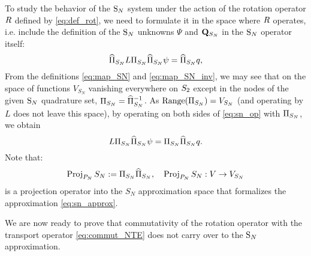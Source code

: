 To study the behavior of the $\text{S}_{N}$ system under the action of the rotation operator $R$
defined by \eqref{eq:def_rot}, we need to formulate it in the space where $R$ operates, i.e. include the definition
of the $\text{S}_{N}$ unknowns $\Psi$ and $\mathbf{Q}_{S_N}$ in the $\text{S}_{N}$ operator itself:
\begin{equation}\label{eq:sn_op}
	\widehat\Pi_{S_N} L\Pi_{S_N} \widehat\Pi_{S_N} \psi = \widehat\Pi_{S_N} q,
\end{equation}
From the definitions \eqref{eq:map_SN} and \eqref{eq:map_SN_inv}, we may see that on the space of functions $V_{S_N}$
 vanishing everywhere on $S_2$ except in the nodes of the given $\text{S}_{N}$ quadrature set, $\Pi_{S_N} = \widehat\Pi_{S_N}^{-1}$. As
 $\operatorname{Range} (\Pi_{S_N}) = V_{S_N}$ (and operating by $L$ does not leave this space), by operating on both sides of
 \eqref{eq:sn_op} with $\Pi_{S_N}$, we obtain
\begin{equation}\label{eq:sn_op2}
	L\Pi_{S_N} \widehat\Pi_{S_N} \psi = \Pi_{S_N}\widehat\Pi_{S_N} q.
\end{equation}
Note that:
\begin{equation}\label{eq:proj_sn}
	\operatorname{Proj}_{P_N}{S_N} := \Pi_{S_N} \widehat\Pi_{S_N}, \quad \operatorname{Proj}_{P_N}{S_N} : V \to V_{S_N}
\end{equation} 
is a projection operator into the $S_N$ approximation space that formalizes the approximation \eqref{eq:sn_approx}.

We are now ready to prove that commutativity of the rotation operator with the transport operator \eqref{eq:commut_NTE} 
does not carry over to the $\text{S}_{N}$ approximation.

